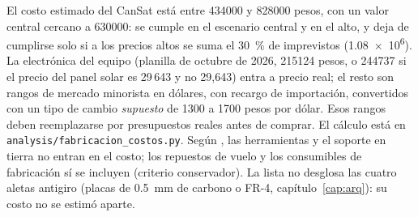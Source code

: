 El costo estimado del CanSat está entre \num{434000} y \num{828000} pesos, con un valor
central cercano a \num{630000}:  se cumple en el escenario central y en el alto, y deja de
cumplirse solo si a los precios altos se suma el \SI{30}{\percent} de imprevistos
(\num{1.08e6}). La electrónica del equipo (planilla de octubre de 2026,
\num{215124} pesos, o \num{244737} si el precio del panel solar es 29\,643 y no 29,643) entra a precio
real; el resto son rangos de mercado minorista en dólares, con recargo de importación,
convertidos con un tipo de cambio \emph{supuesto} de 1300 a 1700 pesos por dólar. Esos
rangos deben reemplazarse por presupuestos reales antes de comprar. El cálculo está en
\texttt{analysis/fabricacion\_costos.py}. Según , las herramientas y el soporte
en tierra no entran en el costo; los repuestos de vuelo y los consumibles de fabricación sí
se incluyen (criterio conservador). La lista no desglosa las cuatro aletas antigiro (placas de \SI{0.5}{mm} de
carbono o FR-4, capítulo~\ref{cap:arq}): su costo no se estimó aparte.


